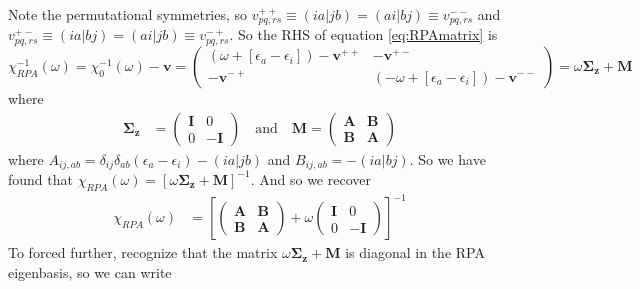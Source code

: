 Note the permutational symmetries, so $v^{++}_{pq,rs} \equiv (ia|jb) = (ai|bj) \equiv v^{--}_{pq,rs}$ and $v^{+-}_{pq,rs} \equiv (ia|bj) = (ai|jb) \equiv v^{-+}_{pq,rs}$. So the RHS of equation \ref{eq:RPAmatrix} is
\begin{equation}
    \chi_{RPA}^{-1}(\omega) = \chi_0^{-1}(\omega) - \mathbf{v} = \begin{pmatrix}
        \left(\omega + \left[\epsilon_a - \epsilon_i\right]\right) - \mathbf{v}^{++} & -\mathbf{v}^{+-} \\
        -\mathbf{v}^{-+} & \left(-\omega + \left[\epsilon_a - \epsilon_i\right]\right) - \mathbf{v}^{--}
    \end{pmatrix}
= \omega \mathbf{\Sigma_z} + \mathbf{M}
\end{equation}
where 
\begin{align}
\mathbf{\Sigma_z} &= \begin{pmatrix}
    \mathbf{I} & 0 \\
    0 & -\mathbf{I}
\end{pmatrix}  \quad \text{and} \quad \mathbf{M} = \begin{pmatrix}
    \textbf{A} & \textbf{B} \\
    \textbf{B} & \textbf{A}
\end{pmatrix}
\end{align}
where $A_{ij,ab} = \delta_{ij}\delta_{ab}\left(\epsilon_a - \epsilon_i\right) - (ia|jb)$ and $B_{ij,ab} = -(ia|bj)$. So we have found that $\chi_{RPA}(\omega) = \left[\omega \mathbf{\Sigma_z} + \mathbf{M}\right]^{-1}$. And so we recover
\begin{align}
\chi_{RPA}(\omega) &= \left[\left(\begin{array}{ll}
\mathbf{A} & \mathbf{B} \\
\mathbf{B} & \mathbf{A}
\end{array}\right)+\omega\left(\begin{array}{cc}
\mathbf{I} & 0 \\
0 & -\mathbf{I}
\end{array}\right)\right]^{-1}
\end{align}
To forced further, recognize that the matrix $\omega \mathbf{\Sigma_z} + \mathbf{M}$ is diagonal in the RPA eigenbasis, so we can write
